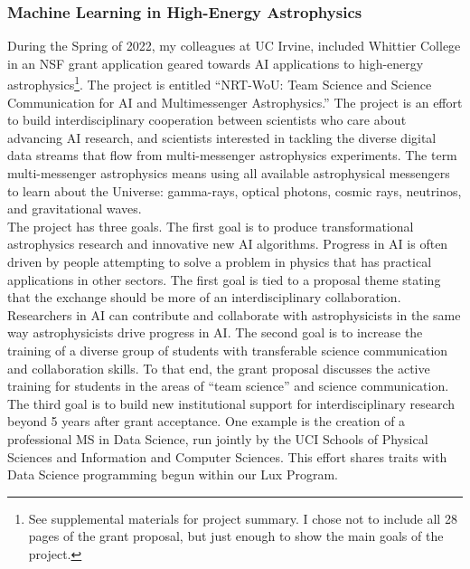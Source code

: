 \documentclass[../../../main.tex]{subfiles}
\begin{document}
\subsubsection{Machine Learning in High-Energy Astrophysics}

During the Spring of 2022, my colleagues at UC Irvine, included Whittier College in an NSF grant application geared towards AI applications to high-energy astrophysics\footnote{See supplemental materials for project summary.  I chose not to include all 28 pages of the grant proposal, but just enough to show the main goals of the project.}.  The project is entitled ``NRT-WoU: Team Science and Science Communication for AI and Multimessenger Astrophysics.''  The project is an effort to build interdisciplinary cooperation between scientists who care about advancing AI research, and scientists interested in tackling the diverse digital data streams that flow from multi-messenger astrophysics experiments.  The term multi-messenger astrophysics means using all available astrophysical messengers to learn about the Universe: gamma-rays, optical photons, cosmic rays, neutrinos, and gravitational waves.
\\
\vspace{0.15cm}
The project has three goals.  The first goal is to produce transformational astrophysics research and innovative new AI algorithms.  Progress in AI is often driven by people attempting to solve a problem in physics that has practical applications in other sectors.  The first goal is tied to a proposal theme stating that the exchange should be more of an interdisciplinary collaboration.  Researchers in AI can contribute and collaborate with astrophysicists in the same way astrophysicists drive progress in AI.  The second goal is to increase the training of a diverse group of students with transferable science communication and collaboration skills.  To that end, the grant proposal discusses the active training for students in the areas of ``team science'' and science communication.  The third goal is to build new institutional support for interdisciplinary research beyond 5 years after grant acceptance.  One example is the creation of a professional MS in Data Science, run jointly by the UCI Schools of Physical Sciences and Information and Computer Sciences.  This effort shares traits with Data Science programming begun within our Lux Program.
\\
\vspace{0.15cm}
\end{document}
